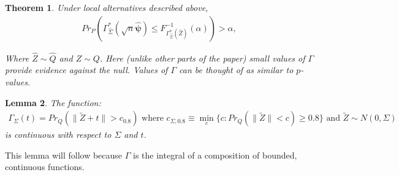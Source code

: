 \documentclass{article}
\newtheorem{theorem}{Theorem}
\newtheorem{lemma}[theorem]{Lemma}
\newcommand{\vmat}{\Sigma}
\newcommand{\disto}{P}
\newcommand{\rvv}{Z}
\newcommand{\distv}{Q}
\begin{document}
\begin{theorem}

Under local alternatives described above, 
\begin{align*}
	Pr_{\disto}\left(\Gamma^*_{\hat{\vmat}}(\sqrt{n}\hat{\boldsymbol{\psi}}) \leq F^{-1}_{\Gamma^*_{\hat{\vmat}}(\hat{\rvv})}(\alpha)\right) > \alpha,
\end{align*}
 
Where $\hat{\rvv} \sim \hat{\distv}$ and $\rvv \sim \distv$. Here (unlike other parts of the paper) small values of $\Gamma$ provide evidence against the null.  Values of $\Gamma$ can be thought of as similar to $p$-values.
\end{theorem}

\begin{lemma}
	\label{lemma:cont_of_gam}
	The function:
	\begin{align*}
		\Gamma_{\Sigma}(t) = Pr_\distv(\|\tilde\rvv + t\| > c_{0.8})  \text{ where }  c_{\vmat, 0.8} \equiv \min_{c}\{c : Pr_\distv(\|\tilde\rvv\| < c) \geq 0.8 \} \text{ and } \tilde\rvv \sim N(0, \Sigma)
	\end{align*}
	is continuous with respect to $\Sigma$ and $t$.  
\end{lemma}

This lemma will follow because $\Gamma$ is the integral of a composition of bounded, continuous functions.   
\end{document}
